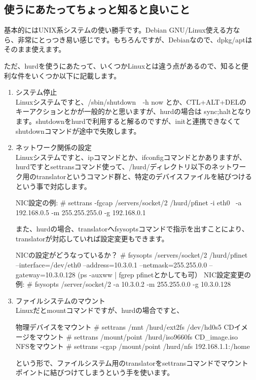 \documentclass[mingoth,a4paper]{jsarticle}
\begin{document}
\subsection{使うにあたってちょっと知ると良いこと}

 基本的にはUNIX系システムの使い勝手です。Debian GNU/Linux使える方なら、非常にとっつき易い感じです。もちろんですが、Debianなので、dpkg/aptはそのまま使えます。

 ただ、hurdを使うにあたって、いくつかLinuxとは違う点があるので、知ると便利な件をいくつか以下に記載します。

\begin{enumerate}
\item システム停止 \\
Linuxシステムですと、/sbin/shutdown　-h now とか、CTL+ALT+DELのキーアクションとかが一般的かと思いますが、hurdの場合は sync;haltとなります。shutdownをhurdで利用すると解るのですが、initと連携できなくてshutdownコマンドが途中で失敗します。
\item ネットワーク関係の設定 \\
Linuxシステムですと、ipコマンドとか、ifconfigコマンドとかありますが、
hurdですとsettransコマンド使って、/hurd/ディレクトリ以下のネットワーク用のtranslatorというコマンド群と、特定のデバイスファイルを結びつけるという事で対応します。
\begin{commandline}
NIC設定の例:
# settrans -fgcap /servers/socket/2 /hurd/pfinet -i eth0 \
     -a 192.168.0.5 -m 255.255.255.0 -g 192.168.0.1
\end{commandline}
 また、hurdの場合、translatorへfsysoptsコマンドで指示を出すことにより、translatorが対応していれば設定変更もできます。
\begin{commandline}
NICの設定がどうなっているか？
# fsysopts /servers/socket/2
/hurd/pfinet --interface=/dev/eth0 --address=10.3.0.1 --netmask=255.255.0.0 --gateway=10.3.0.128
(ps -auxww | fgrep pfinetとかしても可）
NIC設定変更の例:
# fsysopts /server/socket/2 -a 10.3.0.2 -m 255.255.0.0 -g 10.3.0.128 
\end{commandline}
\item ファイルシステムのマウント\\
Linuxだとmountコマンドですが、hurdの場合ですと、
\begin{commandline}
物理デバイスをマウント
# settrans /mnt /hurd/ext2fs /dev/hd0s5
CDイメージをマウント
# settrans /mount/point /hurd/iso9660fs CD_image.iso
NFSをマウント
# settrans -cgap /mount/point /hurd/nfs 192.168.1.1:/home
\end{commandline}
という形で、ファイルシステム用のtranslatorをsettransコマンドでマウントポイントに結びつけてしまうという手を使います。
\end{enumerate}
\end{document}
